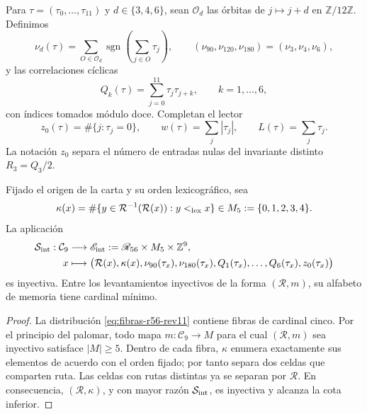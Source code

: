 Para \(\tau=(\tau_0,\ldots,\tau_{11})\) y
\(d\in\{3,4,6\}\), sean \(\mathcal O_d\) las órbitas de
\(j\mapsto j+d\) en \(\mathbb Z/12\mathbb Z\). Definimos
\[
 \nu_d(\tau)=
 \sum_{O\in\mathcal O_d}
 \operatorname{sgn}\!\left(\sum_{j\in O}\tau_j\right),
 \qquad
 (\nu_{90},\nu_{120},\nu_{180})=(\nu_3,\nu_4,\nu_6),
\]
y las correlaciones cíclicas
\[
 Q_k(\tau)=\sum_{j=0}^{11}\tau_j\tau_{j+k},
 \qquad k=1,\ldots,6,
\]
con índices tomados módulo doce. Completan el lector
\[
 z_0(\tau)=\#\{j:\tau_j=0\},\qquad
 w(\tau)=\sum_j|\tau_j|,\qquad
 L(\tau)=\sum_j\tau_j.
\]
La notación \(z_0\) separa el número de entradas nulas del invariante distinto
\(R_3=Q_3/2\).

\begin{theorem}
\label{thm:selector-interno-minimo-rev11}
Fijado el origen de la carta y su orden lexicográfico, sea
\[
 \kappa(x)=
 \#\{y\in\mathcal R^{-1}(\mathcal R(x)):y<_{\rm lex}x\}
 \in M_5:=\{0,1,2,3,4\}.
\]
La aplicación
\begin{align}
 \mathcal S_{\rm int}:\mathcal C_9&\longrightarrow
 \mathscr E_{\rm int}:=\mathscr R_{56}\times M_5\times\mathbb Z^9,
 \notag\\
 x&\longmapsto
 \bigl(\mathcal R(x),\kappa(x),\nu_{90}(\tau_x),
 \nu_{180}(\tau_x),Q_1(\tau_x),\ldots,Q_6(\tau_x),z_0(\tau_x)\bigr)
 \label{eq:selector-interno-rev11}
\end{align}
es inyectiva. Entre los levantamientos inyectivos de la forma
\((\mathcal R,m)\), su alfabeto de memoria tiene cardinal mínimo.
\end{theorem}

\begin{proof}
La distribución \eqref{eq:fibras-r56-rev11} contiene fibras de cardinal
cinco. Por el principio del palomar, todo mapa \(m:\mathcal C_9\to M\) para
el cual \((\mathcal R,m)\) sea inyectivo satisface \(|M|\geq5\). Dentro de
cada fibra, \(\kappa\) enumera exactamente sus elementos de acuerdo con el
orden fijado; por tanto separa dos celdas que comparten ruta. Las celdas con
rutas distintas ya se separan por \(\mathcal R\). En consecuencia,
\((\mathcal R,\kappa)\), y con mayor razón
\(\mathcal S_{\rm int}\), es inyectiva y alcanza la cota inferior.
\end{proof}

